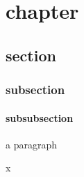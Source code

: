 \documentclass{scrbook}
\begin{document}
\pagestyle{empty}\renewcommand{}


\tableofcontents

\chapter{chapter}
\section{section}
\subsection{subsection}
\subsubsection{subsubsection}

    a paragraph\par x
   \tagmcend
 \tagstructend

\tagstructend   %
\end{document}
